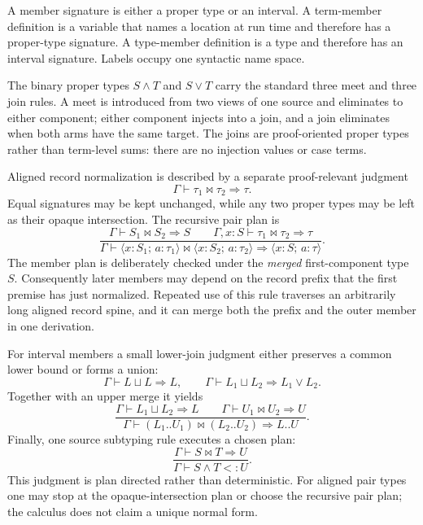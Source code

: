 \documentclass[acmsmall,screen,nonacm]{acmart}
\newcommand{\pairty}[4]{\langle #1\!:\!#2;\,#3\!:\!#4\rangle}
\newcommand{\interty}[2]{#1\mathbin{\wedge}#2}
\newcommand{\unionty}[2]{#1\mathbin{\vee}#2}
\newcommand{\mergeop}{\mathbin{\bowtie}}
\newcommand{\joinop}{\mathbin{\sqcup}}
\begin{document}
A member signature is either a proper type or an interval. A term-member
definition is a variable that names a location at run time and therefore has
a proper-type signature. A type-member definition is a type and therefore
has an interval signature.
Labels occupy one syntactic name space.

The binary proper types \(\interty{S}{T}\) and \(\unionty{S}{T}\) carry the
standard three meet and three join rules. A meet is introduced from two views
of one source and eliminates to either component; either component injects
into a join, and a join eliminates when both arms have the same target. The
joins are proof-oriented proper types rather than term-level sums: there are
no injection values or case terms.

Aligned record normalization is described by a separate proof-relevant
judgment
\[
  \Gamma\vdash \tau_1\mergeop\tau_2\Longrightarrow\tau.
\]
Equal signatures may be kept unchanged, while any two proper types may be
left as their opaque intersection. The recursive pair plan is
\[
  \frac{
    \Gamma\vdash S_1\mergeop S_2\Longrightarrow S
    \qquad
    \Gamma,x:S\vdash\tau_1\mergeop\tau_2\Longrightarrow\tau
  }{
    \Gamma\vdash
    \pairty{x}{S_1}{a}{\tau_1}\mergeop
    \pairty{x}{S_2}{a}{\tau_2}
    \Longrightarrow
    \pairty{x}{S}{a}{\tau}
  }.
\]
The member plan is deliberately checked under the \emph{merged}
first-component type \(S\). Consequently later members may depend on the
record prefix that the first premise has just normalized. Repeated use of
this rule traverses an arbitrarily long aligned record spine, and it can
merge both the prefix and the outer member in one derivation.

For interval members a small lower-join judgment either preserves a common
lower bound or forms a union:
\[
  \Gamma\vdash L\joinop L\Longrightarrow L,
  \qquad
  \Gamma\vdash L_1\joinop L_2\Longrightarrow\unionty{L_1}{L_2}.
\]
Together with an upper merge it yields
\[
  \frac{
    \Gamma\vdash L_1\joinop L_2\Longrightarrow L
    \qquad
    \Gamma\vdash U_1\mergeop U_2\Longrightarrow U
  }{
    \Gamma\vdash (L_1..U_1)\mergeop(L_2..U_2)
      \Longrightarrow L..U}.
\]
Finally, one source subtyping rule executes a chosen plan:
\[
  \frac{\Gamma\vdash S\mergeop T\Longrightarrow U}
       {\Gamma\vdash\interty{S}{T}<:U}.
\]
This judgment is plan directed rather than deterministic. For aligned pair
types one may stop at the opaque-intersection plan or choose the recursive
pair plan; the calculus does not claim a unique normal form.
\end{document}
